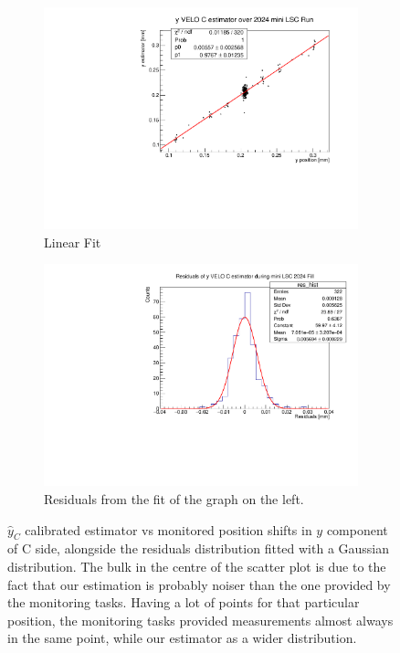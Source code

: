\begin{figure}
    \centering
    \begin{subfigure}{0.48\textwidth}
    \includegraphics[width=\linewidth]{figures/yVeloC_fit_comparison.pdf}
    \caption{Linear Fit}\label{fig:yCfit_comparison}
    \end{subfigure}
    \begin{subfigure}{0.48\textwidth}
    \includegraphics[width=\linewidth]{figures/yVeloC_res_comparison.pdf}
    \caption{Residuals from the fit of the graph on the left. }\label{fig:yCres_comparison}
    \end{subfigure}
    \caption{$\hat{y}_{C}$ calibrated estimator vs monitored position shifts in $y$ component of C side, alongside the residuals distribution fitted with a Gaussian distribution. The bulk in the centre of the scatter plot is due to the fact that our estimation is probably noiser than the one provided by the monitoring tasks. Having a lot of points for that particular position, the monitoring tasks provided measurements almost always in the same point, while our estimator as a wider distribution.}
    \label{fig:yC_comparison}
\end{figure}

